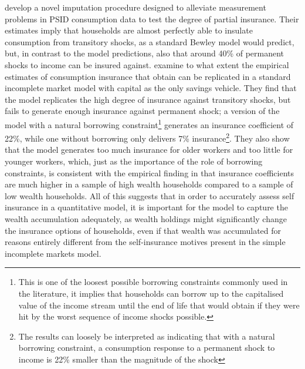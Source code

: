 \citet{BlundellPistaferriPreston2008} develop a novel imputation procedure 
designed to alleviate measurement problems in PSID consumption data to test the
degree of partial insurance. Their estimates imply that households are almost
perfectly able to insulate consumption from transitory shocks, as a standard
Bewley model would predict, but, in contrast to the model predictions, also that
around 40\% of permanent shocks to income can be insured against. 
\citet{KaplanViolante2010} examine to what extent the empirical estimates
of consumption insurance that \citet{BlundellPistaferriPreston2008} obtain can
be replicated in a standard incomplete market model with capital as the only 
savings vehicle. They find that the model replicates the high degree of insurance
against transitory shocks, but fails to generate enough insurance against permanent
shock; a version of the model with a natural borrowing constraint\footnote{This
is one of the loosest possible borrowing constraints commonly used in the literature,
it implies that households can borrow up to the capitalised value of the income
stream until the end of life that would obtain if they were hit by the worst 
sequence of income shocks possible.} generates an insurance coefficient of 22\%, 
while one without borrowing only delivers 7\% insurance\footnote{
The results can loosely be interpreted as indicating that with a natural borrowing
constraint, a consumption response to a permanent shock to income is 22\% smaller
than the magnitude of the shock}. They also show that the model generates
too much insurance for older workers and too little for younger workers, which, 
just as the importance of the role of borrowing constraints, is consistent with
the empirical finding in \citet{BlundellPistaferriPreston2008} that insurance
coefficients are much higher in a sample of high wealth households compared to 
a sample of low wealth households. All of this suggests that in order to accurately
assess self insurance in a quantitative model, it is important for the model to
capture the wealth accumulation adequately, as wealth holdings might significantly
change the insurance options of households, even if that wealth was accumulated
for reasons entirely different from the self-insurance motives present in the 
simple incomplete markets model.


